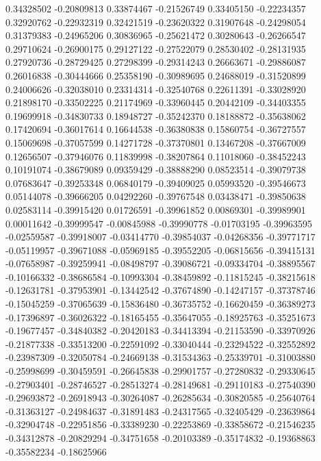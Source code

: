0.34328502   -0.20809813 
0.33874467   -0.21526749 
0.33405150   -0.22234357 
0.32920762   -0.22932319 
0.32421519   -0.23620322 
0.31907648   -0.24298054 
0.31379383   -0.24965206 
0.30836965   -0.25621472 
0.30280643   -0.26266547 
0.29710624   -0.26900175 
0.29127122   -0.27522079 
0.28530402   -0.28131935 
0.27920736   -0.28729425 
0.27298399   -0.29314243 
0.26663671   -0.29886087 
0.26016838   -0.30444666 
0.25358190   -0.30989695 
0.24688019   -0.31520899 
0.24006626   -0.32038010 
0.23314314   -0.32540768 
0.22611391   -0.33028920 
0.21898170   -0.33502225 
0.21174969   -0.33960445 
0.20442109   -0.34403355 
0.19699918   -0.34830733 
0.18948727   -0.35242370 
0.18188872   -0.35638062 
0.17420694   -0.36017614 
0.16644538   -0.36380838 
0.15860754   -0.36727557 
0.15069698   -0.37057599 
0.14271728   -0.37370801 
0.13467208   -0.37667009 
0.12656507   -0.37946076 
0.11839998   -0.38207864 
0.11018060   -0.38452243 
0.10191074   -0.38679089 
0.09359429   -0.38888290 
0.08523514   -0.39079738 
0.07683647   -0.39253348 
0.06840179   -0.39409025 
0.05993520   -0.39546673 
0.05144078   -0.39666205 
0.04292260   -0.39767548 
0.03438471   -0.39850638 
0.02583114   -0.39915420 
0.01726591   -0.39961852 
0.00869301   -0.39989901 
0.00011642   -0.39999547 
-0.00845988  -0.39990778 
-0.01703195  -0.39963595 
-0.02559587  -0.39918007 
-0.03414770  -0.39854037 
-0.04268356  -0.39771717 
-0.05119957  -0.39671088 
-0.05969185  -0.39552205 
-0.06815656  -0.39415131 
-0.07658987  -0.39259941 
-0.08498797  -0.39086721 
-0.09334704  -0.38895567 
-0.10166332  -0.38686584 
-0.10993304  -0.38459892 
-0.11815245  -0.38215618 
-0.12631781  -0.37953901 
-0.13442542  -0.37674890 
-0.14247157  -0.37378746 
-0.15045259  -0.37065639 
-0.15836480  -0.36735752 
-0.16620459  -0.36389273 
-0.17396897  -0.36026322 
-0.18165455  -0.35647055 
-0.18925763  -0.35251673 
-0.19677457  -0.34840382 
-0.20420183  -0.34413394 
-0.21153590  -0.33970926 
-0.21877338  -0.33513200 
-0.22591092  -0.33040444 
-0.23294522  -0.32552892 
-0.23987309  -0.32050784 
-0.24669138  -0.31534363 
-0.25339701  -0.31003880 
-0.25998699  -0.30459591 
-0.26645838  -0.29901757 
-0.27280832  -0.29330645 
-0.27903401  -0.28746527 
-0.28513274  -0.28149681 
-0.29110183  -0.27540390 
-0.29693872  -0.26918943 
-0.30264087  -0.26285634 
-0.30820585  -0.25640764 
-0.31363127  -0.24984637 
-0.31891483  -0.24317565 
-0.32405429  -0.23639864 
-0.32904748  -0.22951856 
-0.33389230  -0.22253869 
-0.33858672  -0.21546235 
-0.34312878  -0.20829294 
-0.34751658  -0.20103389 
-0.35174832  -0.19368863 
-0.35582234  -0.18625966 
